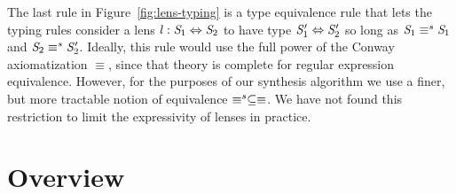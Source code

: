 \documentclass[acmsmall]{acmart}
\begin{document}
The last rule in Figure~\ref{fig:lens-typing} is a type equivalence rule
that lets the typing rules consider a lens
$\mathit{l} : \mathit{S}_1 \Leftrightarrow \mathit{S}_2$ to have type
$\mathit{S}_1' \Leftrightarrow \mathit{S}_2'$ so long as
$\mathit{S}_1 \equiv^s \mathit{S}_1$ and
$\mathit{S}_2 \equiv^s \mathit{S}_2'$.  Ideally, this rule would use
the full power of the Conway axiomatization $\equiv$, since that
theory is complete for regular expression equivalence.  However, for
the purposes of our synthesis algorithm we use a finer, but more
tractable notion of equivalence $\equiv^s \subseteq \equiv$.
We have not found this restriction to limit
the expressivity of lenses in practice.




\section{Overview}
\label{overview}
\end{document}
